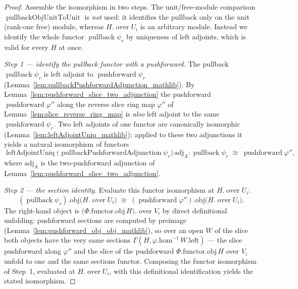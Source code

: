 \begin{proof}
    \leanok
  Assemble the isomorphism in two steps. The unit/free-module comparison
  \(\operatorname{pullbackObjUnitToUnit}\) is \emph{not} used: it identifies the pullback only on the
  unit (rank-one free) module, whereas \(H.\operatorname{over} U_i\) is an arbitrary module. Instead we
  identify the whole functor \(\operatorname{pullback}\psi_r\) by uniqueness of left adjoints, which is
  valid for every \(H\) at once.

  \emph{Step 1 --- identify the pullback functor with a pushforward.} The pullback
  \(\operatorname{pullback}\psi_r\) is left adjoint to \(\operatorname{pushforward}\psi_r\)
  (Lemma~\ref{lem:pullbackPushforwardAdjunction_mathlib}). By
  Lemma~\ref{lem:pushforward_slice_two_adjunction} the pushforward
  \(\operatorname{pushforward}\varphi''\) along the reverse slice ring map \(\varphi''\) of
  Lemma~\ref{lem:slice_reverse_ring_map} is \emph{also} left adjoint to the same
  \(\operatorname{pushforward}\psi_r\). Two left adjoints of one functor are canonically isomorphic
  (Lemma~\ref{lem:leftAdjointUniq_mathlib}); applied to these two adjunctions it yields a natural
  isomorphism of functors
  \[
    \operatorname{leftAdjointUniq}\bigl(\operatorname{pullbackPushforwardAdjunction}\psi_r\bigr)\,
      \mathrm{adj}_A : \operatorname{pullback}\psi_r \;\cong\; \operatorname{pushforward}\varphi'',
  \]
  where \(\mathrm{adj}_A\) is the two-pushforward adjunction of
  Lemma~\ref{lem:pushforward_slice_two_adjunction}.

  \emph{Step 2 --- the section identity.} Evaluate this functor isomorphism at \(H.\operatorname{over}
  U_i\):
  \[
    (\operatorname{pullback}\psi_r).\mathrm{obj}\bigl(H.\operatorname{over} U_i\bigr) \;\cong\;
    (\operatorname{pushforward}\varphi'').\mathrm{obj}\bigl(H.\operatorname{over} U_i\bigr).
  \]
  The right-hand object is \(\bigl(\Phi.\mathrm{functor}.\mathrm{obj}\, H\bigr).\operatorname{over}
  V_i\) by direct definitional unfolding: pushforward sections are computed by
  preimage (Lemma~\ref{lem:pushforward_obj_obj_mathlib}), so over an open \(W\) of the slice both
  objects have the very same sections \(\Gamma(H, \varphi.\mathrm{hom}^{-1}\, W.\mathrm{left})\) ---
  the slice pushforward along \(\varphi''\) and the slice of the pushforward
  \(\Phi.\mathrm{functor}.\mathrm{obj}\, H\) over \(V_i\) unfold to one and the same sections functor.
  Composing the functor isomorphism of Step~1, evaluated at \(H.\operatorname{over} U_i\), with this
  definitional identification yields the stated isomorphism.
\end{proof}

